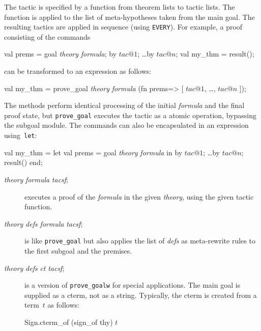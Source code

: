 The tactic is specified by a function from theorem lists to tactic lists.
The function is applied to the list of meta-hypotheses taken from the main
goal.  The resulting tactics are applied in sequence (using {\tt EVERY}).
For example, a proof consisting of the commands
\begin{ttbox} 
val prems = goal {\it theory} {\it formula};
by \(tac@1\);  \ldots  by \(tac@n\);
val my_thm = result();
\end{ttbox}
can be transformed to an expression as follows:
\begin{ttbox} 
val my_thm = prove_goal {\it theory} {\it formula}
 (fn prems=> [ \(tac@1\), \ldots, \(tac@n\) ]);
\end{ttbox}
The methods perform identical processing of the initial {\it formula} and
the final proof state, but {\tt prove_goal} executes the tactic as a
atomic operation, bypassing the subgoal module.  The commands can also be
encapsulated in an expression using~{\tt let}:
\begin{ttbox} 
val my_thm = 
    let val prems = goal {\it theory} {\it formula}
    in  by \(tac@1\);  \ldots  by \(tac@n\);  result() end;
\end{ttbox}

\begin{description}
\item[ {\it theory} {\it formula} {\it tacsf}; ] 
executes a proof of the {\it formula\/} in the given {\it theory}, using
the given tactic function.

\item[ {\it theory} {\it defs} {\it formula} 
      {\it tacsf}; ]
is like {\tt prove_goal} but also applies the list of {\it defs\/} as
meta-rewrite rules to the first subgoal and the premises.

\item[ {\it theory} {\it defs} {\it ct}
      {\it tacsf}; ] 
is a version of {\tt prove_goalw} for special applications.  The main
goal is supplied as a cterm, not as a string.  Typically, the cterm is
created from a term~$t$ as follows:
\begin{ttbox}
Sign.cterm_of (sign_of thy) \(t\)
\end{ttbox}
\end{description}


